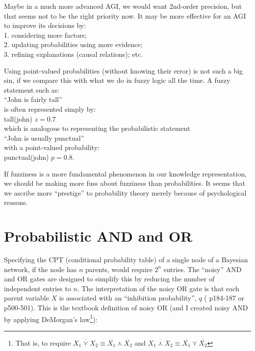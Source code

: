 Maybe in a much more advanced AGI, we would want 2nd-order precision, but that seems not to be the right priority now.  It may be more effective for an AGI to improve its decisions by:\\
\hspace*{1cm} 1. considering more factors;\\
\hspace*{1cm} 2. updating probabilities using more evidence;\\
\hspace*{1cm} 3. refining explanations (causal relations);  etc.

Using point-valued probabilities (without knowing their error) is not such a big sin, if we compare this with what we do in fuzzy logic all the time.  A fuzzy statement such as:\\
\hspace*{1cm} ``John is fairly tall''\\
is often represented simply by:\\
\hspace*{1cm} tall(john) \hspace{0.5cm} $z = 0.7$\\
which is analogous to representing the probabilistic statement\\
\hspace*{1cm} ``John is usually punctual''\\
with a point-valued probability:\\
\hspace*{1cm} punctual(john) \hspace{0.5cm} $p = 0.8$.

If fuzziness is a more fundamental phenomenon in our knowledge representation, we should be making more fuss about fuzziness than probabilities.  It seems that we ascribe more ``prestige'' to probability theory merely because of psychological reasons.

\section{Probabilistic AND and OR}
\label{sec:probabilistic-AND-OR}

Specifying the CPT (conditional probability table) of a single node of a Bayesian network, if the node has $n$ parents, would require $2^n$ entries.  The ``noisy'' AND and OR gates are designed to simplify this by reducing the number of independent entries to $n$.  The interpretation of the noisy OR gate is that each parent variable $X$ is associated with an ``inhibition probability'', $q$ (\citep*{Pearl1988} p184-187 or \citep*{Russell2003} p500-501).  This is the textbook definition of noisy OR (and I created noisy AND by applying DeMorgan's law\footnote{That is, to require $\overline{X_1 \curlyvee X_2} \equiv \overline{X_1} \curlywedge \overline{X_2}$ and $\overline{X_1 \curlywedge X_2} \equiv \overline{X_1} \curlyvee \overline{X_2}$ }):

